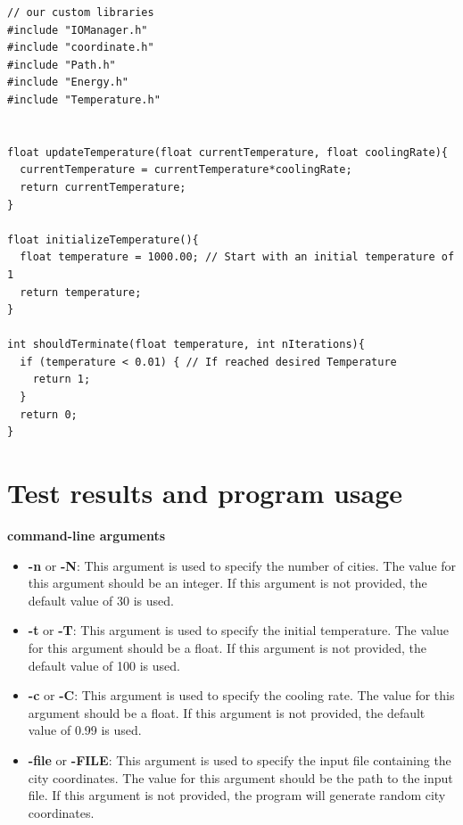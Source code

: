 \documentclass[a4paper,10pt]{article}
\begin{document}
\begin{lstlisting}[style = code, title = Path.c]
// our custom libraries
#include "IOManager.h"
#include "coordinate.h"
#include "Path.h"
#include "Energy.h"
#include "Temperature.h"


float updateTemperature(float currentTemperature, float coolingRate){
  currentTemperature = currentTemperature*coolingRate;
  return currentTemperature;
}

float initializeTemperature(){
  float temperature = 1000.00; // Start with an initial temperature of 1
  return temperature;
}

int shouldTerminate(float temperature, int nIterations){
  if (temperature < 0.01) { // If reached desired Temperature
    return 1;
  }
  return 0;
}
\end{lstlisting}

\section{Test results and program usage}

\textbf{command-line arguments}

\begin{itemize}
    \item \textbf{-n} or \textbf{-N}: This argument is used to specify the number of cities. The value for this argument should be an integer. If this argument is not provided, the default value of 30 is used.
\end{itemize}

 \begin{itemize}
     \item \textbf{-t} or \textbf{-T}: This argument is used to specify the initial temperature. The value for this argument should be a float. If this argument is not provided, the default value of 100 is used.
 \end{itemize}
 \begin{itemize}
     \item \textbf{-c} or \textbf{-C}: This argument is used to specify the cooling rate. The value for this argument should be a float. If this argument is not provided, the default value of 0.99 is used.
 \end{itemize}

 \begin{itemize}
     \item \textbf{-file} or \textbf{-FILE}: This argument is used to specify the input file containing the city coordinates. The value for this argument should be the path to the input file. If this argument is not provided, the program will generate random city coordinates.
 \end{itemize}
\end{document}
